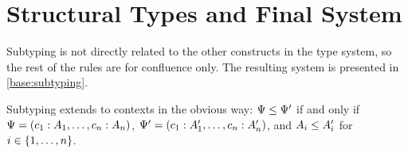 
\section{Structural Types and Final System}

Subtyping is not directly related to the other constructs in the type system, so the rest of the rules are for confluence only. The resulting system is presented in \cref{base:subtyping}.


Subtyping extends to contexts in the obvious way: $\Psi \le \Psi'$ if and only if $\Psi = (c_1 : A_1, \ldots, c_n : A_n)$, $\Psi' = (c_1 : A_1', \ldots, c_n : A_n')$, and $A_i \le A_i'$ for $i \in \lbrace1, \ldots, n\rbrace$.

